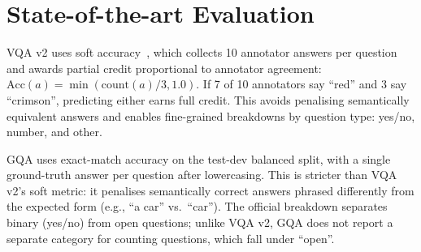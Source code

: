 \section{State-of-the-art Evaluation}

VQA v2 uses soft accuracy~\cite{antol2015vqa}, which collects 10 annotator answers per question and awards partial credit proportional to annotator agreement: $\text{Acc}(a) = \min(\text{count}(a)/3, 1.0)$. If 7 of 10 annotators say ``red'' and 3 say ``crimson'', predicting either earns full credit. This avoids penalising semantically equivalent answers and enables fine-grained breakdowns by question type: yes/no, number, and other.

GQA uses exact-match accuracy on the test-dev balanced split, with a single ground-truth answer per question after lowercasing. This is stricter than VQA v2's soft metric: it penalises semantically correct answers phrased differently from the expected form (e.g., ``a car'' vs.\ ``car''). The official breakdown separates binary (yes/no) from open questions; unlike VQA v2, GQA does not report a separate category for counting questions, which fall under ``open''.
